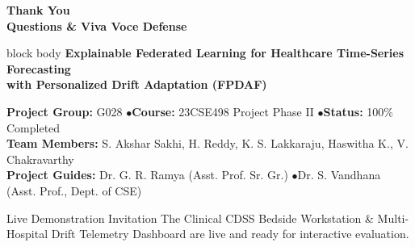 \documentclass[aspectratio=169, 10pt]{beamer}
\begin{document}
\begin{frame}
    \centering
    \vspace{0.3cm}
    {\huge \textbf{\textcolor{amritaMaroon}{Thank You}}} \\[0.3cm]
    {\Large \textbf{Questions \& Viva Voce Defense}} \\[0.25cm]

    \begin{beamercolorbox}[sep=8pt,center,rounded=true,shadow=true,wd=0.88\textwidth]{block body}
        \textbf{Explainable Federated Learning for Healthcare Time-Series Forecasting} \\
        \textbf{with Personalized Drift Adaptation (FPDAF)}
    \end{beamercolorbox}

    \vspace{0.35cm}
    {\small
    \textbf{Project Group:} G028 \quad$\bullet$\quad \textbf{Course:} 23CSE498 Project Phase II \quad$\bullet$\quad \textbf{Status:} 100\% Completed \\[0.15cm]
    \textbf{Team Members:} S. Akshar Sakhi, H. Reddy, K. S. Lakkaraju, Haswitha K., V. Chakravarthy \\[0.15cm]
    \textbf{Project Guides:} Dr. G. R. Ramya (Asst. Prof. Sr. Gr.) \quad$\bullet$\quad Dr. S. Vandhana (Asst. Prof., Dept. of CSE)
    }

    \vspace{0.4cm}
    \begin{alertblock}{\centering Live Demonstration Invitation}
        \centering \small
        The Clinical CDSS Bedside Workstation \& Multi-Hospital Drift Telemetry Dashboard are live and ready for interactive evaluation.
    \end{alertblock}
\end{frame}
\end{document}
